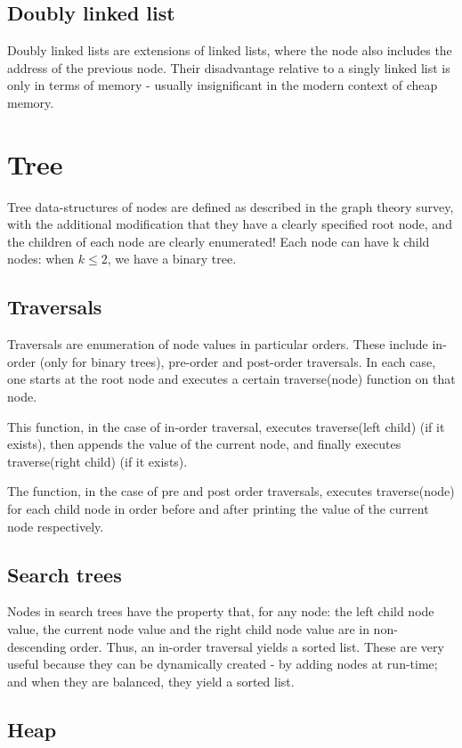 \documentclass[oneside, article]{memoir}
\begin{document}
\subsection{Doubly linked list}
Doubly linked lists are extensions of linked lists, where the node also includes the address of the previous node. Their disadvantage relative to a singly linked list is only in terms of memory - usually insignificant in the modern context of cheap memory.

\section{Tree}
Tree data-structures of nodes are defined as described in the graph theory survey, with the additional modification that they have a clearly specified root  node, and the children of each node are clearly enumerated! Each node can have k child nodes: when $k \leq 2$, we have a binary tree.

\subsection{Traversals}
Traversals are enumeration of node values in particular orders. These include in-order (only for binary trees), pre-order and post-order traversals. In each case, one starts at the root node and executes a certain traverse(node) function on that node.

This function, in the case of in-order traversal, executes traverse(left child) (if it exists), then appends the value of the current node, and finally executes traverse(right child) (if it exists).

The function, in the case of pre and post order traversals, executes traverse(node) for each child node in order before and after printing the value of the current node respectively.

\subsection{Search trees}
Nodes in search trees have the property that, for any node: the left child node value, the current node value and the right child node value are in non-descending order. Thus, an in-order traversal yields a sorted list. These are very useful because they can be dynamically created - by adding nodes at run-time; and when they are balanced, they yield a sorted list.

\subsection{Heap}
\tbc
\end{document}
